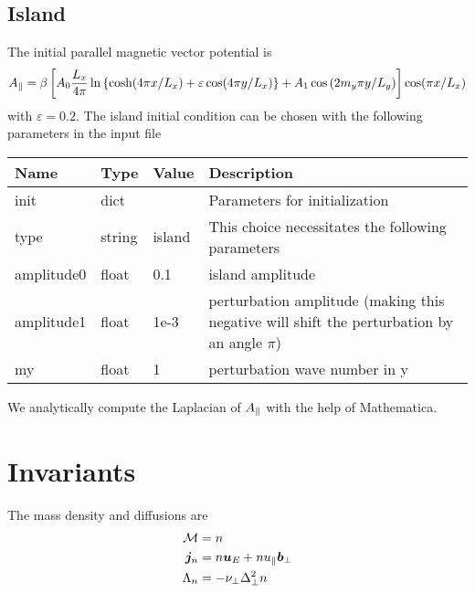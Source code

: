 \subsection{Island}
The initial parallel magnetic vector potential is
\begin{align}
    A_\parallel =\beta \left[ A_0\frac{L_x}{4\pi} \ln \left\{ \cosh( 4\pi x/L_x) + \varepsilon \cos( 4\pi y/L_x)\right\} + A_1\cos{(2m_y \pi y/L_y)}\right] \cos( \pi x /L_x)
\end{align}
with $\varepsilon = 0.2$.
The island initial condition can be chosen with the following parameters in the input file
\begin{longtable}{llll}
\toprule
\rowcolor{gray!50}\textbf{Name} &  \textbf{Type} & \textbf{Value}  & \textbf{Description}  \\ \midrule
init &  dict &   & Parameters for initialization \\
\qquad type      & string & island & This choice necessitates the following parameters \\
\qquad amplitude0  & float &  0.1     &  island amplitude \\
\qquad amplitude1  & float &  1e-3    &  perturbation amplitude (making this negative will shift the perturbation by an angle $\pi$) \\
\qquad my          & float &  1       &  perturbation wave number in y\\
\bottomrule
\end{longtable}
We analytically compute the Laplacian of $A_\parallel$ with the help of Mathematica.

\section{Invariants}
The mass density and diffusions are
\begin{align}
    \mathcal M &= n  \\
    {\boldsymbol{j}}_n &= n  {\boldsymbol{u}}_E + n u_\parallel {\boldsymbol{b}}_\perp \\
     \Lambda_n &= -\nu_\perp \Delta_\perp^2 n   \\
\end{align}

